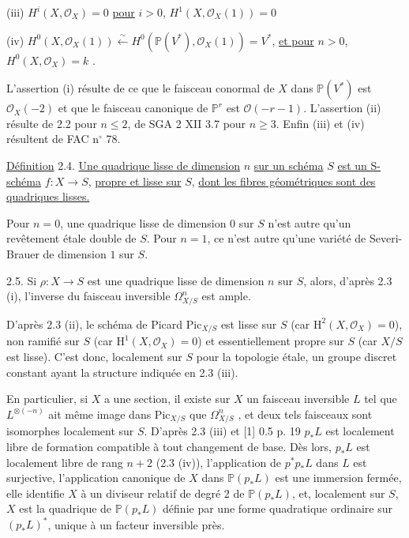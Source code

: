 (iii) \quad $H^i(X,\mathcal{O}_X) = 0$ \underline{pour} $i > 0$, \qquad $H^1(X,\mathcal{O}_X(1)) = 0$

(iv) \quad $H^0(X,\mathcal{O}_X(1)) \stackrel{\sim}{\longleftarrow} H^0( \mathbb{P}(V^*),\mathcal{O}_X(1)) = V^*$, \underline{et pour} $n > 0$, $H^0(X,\mathcal{O}_X) = k$ .

L'assertion (i) résulte de ce que le faisceau conormal de $X$ dans $\mathbb{P}(V^*)$ est $\mathcal{O}_X(-2)$ et que le faisceau canonique de $\mathbb{P}^r$ est $\mathcal{O}(-r-1)$. L'assertion (ii) résulte de 2.2 pour $n \leqslant 2$, de SGA 2 XII 3.7 pour $n \geqslant 3$. Enfin (iii) et (iv) résultent de FAC n$^\circ$ 78.

\underline{Définition} 2.4. \underline{Une quadrique lisse de dimension} $n$ \underline{sur un schéma} $S$ \underline{est un S-schéma} $f : X \longrightarrow S$, \underline{propre et lisse sur} $S$, \underline{dont les fibres géométriques sont des quadriques lisses.}

Pour $n = 0$, une quadrique lisse de dimension $0$ sur $S$ n'est autre qu'un revêtement étale double de $S$. Pour $n = 1$, ce n'est autre qu'une variété de Severi-Brauer de dimension $1$ sur $S$.

2.5. Si $\rho : X \longrightarrow S$ est une quadrique lisse de dimension $n$ sur $S$, alors, d'après 2.3 (i), l'inverse du faisceau inversible $\Omega^n_{X/S}$ est ample.



D'après 2.3 (ii), le schéma de Picard $\mathrm{Pic}_{X/S}$ est lisse sur $S$ (car $\mathrm{H}^2(X,\mathcal{O}_X) = 0$), non ramifié sur $S$ (car $\mathrm{H}^1(X,\mathcal{O}_X) = 0$) et essentiellement propre sur $S$ (car $X/S$ est lisse). C'est donc, localement sur $S$ pour la topologie étale, un groupe discret constant ayant la structure indiquée en 2.3 (iii).

En particulier, si $X$ a une section, il existe sur $X$ un faisceau inversible $L$ tel que $L^{\otimes(-n)}$ ait même image dans $\mathrm{Pic}_{X/S}$ que $\Omega^n_{X/S}$ , et deux tels faisceaux sont isomorphes localement sur $S$. D'après 2.3 (iii) et [1] 0.5 p. 19 $p_*L$ est localement libre de formation compatible à tout changement de base. Dès lors, $p_*L$ est localement libre de rang $n + 2$ (2.3 (iv)), l'application de $p^*p_*L$ dans $L$ est surjective, l'application canonique de $X$ dans $\mathbb{P}(p_*L)$ est une immersion fermée, elle identifie $X$ à un diviseur relatif de degré 2 de $\mathbb{P}(p_*L)$, et, localement sur $S$, $X$ est la quadrique de $\mathbb{P}(p_*L)$ définie par une forme quadratique ordinaire sur $(p_*L)^*$, unique à un facteur inversible près.

